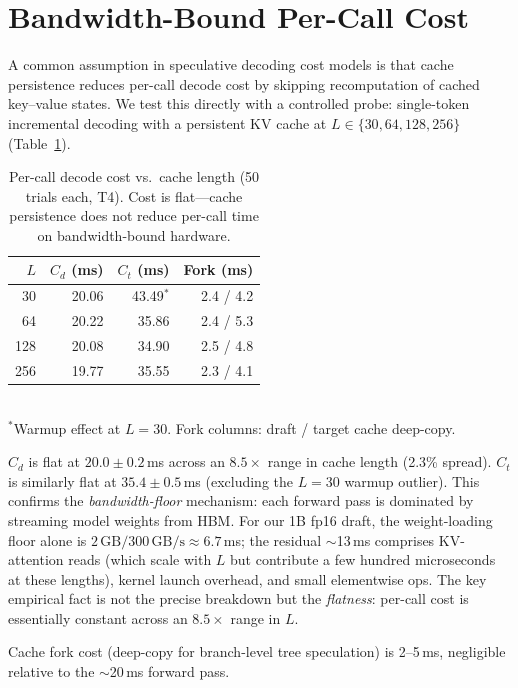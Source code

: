 \documentclass[letterpaper,twocolumn,10pt]{article}
\begin{document}
\section{Bandwidth-Bound Per-Call Cost}
\label{sec:probe}

A common assumption in speculative decoding cost models is that cache persistence reduces per-call decode cost by skipping recomputation of cached key--value states.
We test this directly with a controlled probe: single-token incremental decoding with a persistent KV cache at $L \in \{30, 64, 128, 256\}$ (Table~\ref{tab:probe}).

\begin{table}[t]
\centering
\small
\caption{Per-call decode cost vs.\ cache length (50 trials each, T4). Cost is flat---cache persistence does not reduce per-call time on bandwidth-bound hardware.}
\label{tab:probe}
\smallskip
\begin{tabular}{@{}rrrr@{}}
\toprule
$L$ & $C_d$ (ms) & $C_t$ (ms) & Fork (ms) \\
\midrule
30  & 20.06 & 43.49$^*$ & 2.4 / 4.2 \\
64  & 20.22 & 35.86 & 2.4 / 5.3 \\
128 & 20.08 & 34.90 & 2.5 / 4.8 \\
256 & 19.77 & 35.55 & 2.3 / 4.1 \\
\bottomrule
\end{tabular}
\\[2pt]
{\scriptsize $^*$Warmup effect at $L{=}30$. Fork columns: draft / target cache deep-copy.}
\end{table}

$C_d$ is flat at $20.0 \pm 0.2$\,ms across an $8.5\times$ range in cache length (2.3\% spread).
$C_t$ is similarly flat at $35.4 \pm 0.5$\,ms (excluding the $L{=}30$ warmup outlier).
This confirms the \emph{bandwidth-floor} mechanism: each forward pass is dominated by streaming model weights from HBM.
For our 1B fp16 draft, the weight-loading floor alone is $2\,\text{GB} / 300\,\text{GB/s} \approx 6.7$\,ms; the residual $\sim$13\,ms comprises KV-attention reads (which scale with $L$ but contribute a few hundred microseconds at these lengths), kernel launch overhead, and small elementwise ops.
The key empirical fact is not the precise breakdown but the \emph{flatness}: per-call cost is essentially constant across an $8.5\times$ range in $L$.

Cache fork cost (deep-copy for branch-level tree speculation) is 2--5\,ms, negligible relative to the $\sim$20\,ms forward pass.
\end{document}
